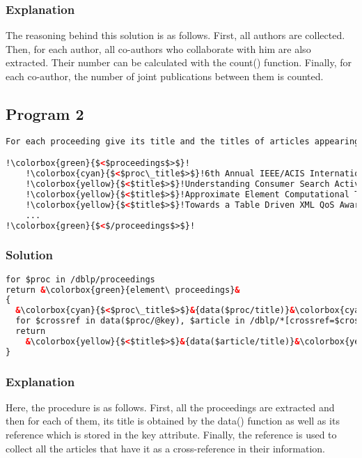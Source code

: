 \documentclass{article}
\begin{document}
\subsubsection{Explanation}
The reasoning behind this solution is as follows. First, all authors are collected. Then, for each author, all co-authors who collaborate with him are also extracted. Their number can be calculated with the count() function. Finally, for each co-author, the number of joint publications between them is counted.

\subsection{Program 2}
\begin{lstlisting}[language=xml, escapechar=!]
For each proceeding give its title and the titles of articles appearing in it, using the following output format.

!\colorbox{green}{$<$proceedings$>$}!
    !\colorbox{cyan}{$<$proc\_title$>$}!6th Annual IEEE/ACIS International Conference (...)!\colorbox{cyan}{$<$/proc\_title$>$}!
    !\colorbox{yellow}{$<$title$>$}!Understanding Consumer Search Activity and Online (...)!\colorbox{yellow}{$<$/title$>$}!
    !\colorbox{yellow}{$<$title$>$}!Approximate Element Computational Time for Domain (...)!\colorbox{yellow}{$<$/title$>$}!
    !\colorbox{yellow}{$<$title$>$}!Towards a Table Driven XML QoS Aware Transmission Framework.!\colorbox{yellow}{$<$/title$>$}!
    ...
!\colorbox{green}{$<$/proceedings$>$}!
\end{lstlisting}

\subsubsection{Solution}
\begin{lstlisting}[language=xml, frame=none, escapechar=&]
for $proc in /dblp/proceedings
return &\colorbox{green}{element\ proceedings}&
{
  &\colorbox{cyan}{$<$proc\_title$>$}&{data($proc/title)}&\colorbox{cyan}{$<$/proc\_title$>$}&,
  for $crossref in data($proc/@key), $article in /dblp/*[crossref=$crossref]
  return
    &\colorbox{yellow}{$<$title$>$}&{data($article/title)}&\colorbox{yellow}{$<$/title$>$}&
}
\end{lstlisting}

\subsubsection{Explanation}
Here, the procedure is as follows. First, all the proceedings are extracted and then for each of them, its title is obtained by the data() function as well as its reference which is stored in the key attribute. Finally, the reference is used to collect all the articles that have it as a cross-reference in their information.
\end{document}
